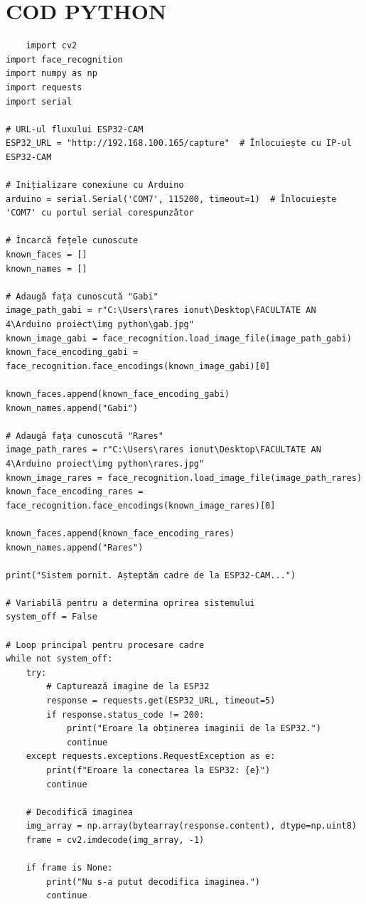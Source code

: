 \documentclass[a4paper,12pt]{report}
\begin{document}
\section{COD PYTHON}
\begin{lstlisting}
    import cv2
import face_recognition
import numpy as np
import requests
import serial

# URL-ul fluxului ESP32-CAM
ESP32_URL = "http://192.168.100.165/capture"  # Înlocuiește cu IP-ul ESP32-CAM

# Inițializare conexiune cu Arduino
arduino = serial.Serial('COM7', 115200, timeout=1)  # Înlocuiește 'COM7' cu portul serial corespunzător

# Încarcă fețele cunoscute
known_faces = []
known_names = []

# Adaugă fața cunoscută "Gabi"
image_path_gabi = r"C:\Users\rares ionut\Desktop\FACULTATE AN 4\Arduino proiect\img python\gab.jpg"
known_image_gabi = face_recognition.load_image_file(image_path_gabi)
known_face_encoding_gabi = face_recognition.face_encodings(known_image_gabi)[0]

known_faces.append(known_face_encoding_gabi)
known_names.append("Gabi")

# Adaugă fața cunoscută "Rares"
image_path_rares = r"C:\Users\rares ionut\Desktop\FACULTATE AN 4\Arduino proiect\img python\rares.jpg"
known_image_rares = face_recognition.load_image_file(image_path_rares)
known_face_encoding_rares = face_recognition.face_encodings(known_image_rares)[0]

known_faces.append(known_face_encoding_rares)
known_names.append("Rares")

print("Sistem pornit. Așteptăm cadre de la ESP32-CAM...")

# Variabilă pentru a determina oprirea sistemului
system_off = False

# Loop principal pentru procesare cadre
while not system_off:
    try:
        # Capturează imagine de la ESP32
        response = requests.get(ESP32_URL, timeout=5)
        if response.status_code != 200:
            print("Eroare la obținerea imaginii de la ESP32.")
            continue
    except requests.exceptions.RequestException as e:
        print(f"Eroare la conectarea la ESP32: {e}")
        continue

    # Decodifică imaginea
    img_array = np.array(bytearray(response.content), dtype=np.uint8)
    frame = cv2.imdecode(img_array, -1)

    if frame is None:
        print("Nu s-a putut decodifica imaginea.")
        continue


\end{lstlisting}
\end{document}
